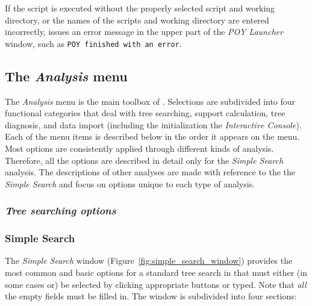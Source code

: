 If the script is executed without the properly selected script and
working directory, or the names of the scripts and working directory are entered incorrectly, \poy issues an
error message in the upper part of the \emph{POY Launcher} window,
such as \texttt{POY finished with an error}.

\subsection{The \emph{Analysis} menu}
The \emph{Analysis} menu is the main toolbox of \poy. Selections are subdivided into four functional categories that deal with tree searching, support calculation, tree diagnosis, and data import (including the initialization the \emph{Interactive Console}). Each of the menu items is described below in the order it
appears on the menu. Most options are consistently applied through different kinds of analysis. Therefore, all the options are described in detail only for the \emph{Simple Search} analysis. The descriptions of other analyses are made with reference to the the \emph{Simple Search} and focus on options unique to each type of analysis.

\subsubsection{\emph{Tree searching options}}

\subsubsection{Simple Search}
The \emph{Simple Search} window (Figure~\ref{fig:simple_search_window})
provides the most common and basic options for a standard tree search
in \poy that must either (in some cases or) be selected by clicking appropriate buttons or typed. Note that \emph{all} the empty fields must be filled in. The window is subdivided into four sections: 

